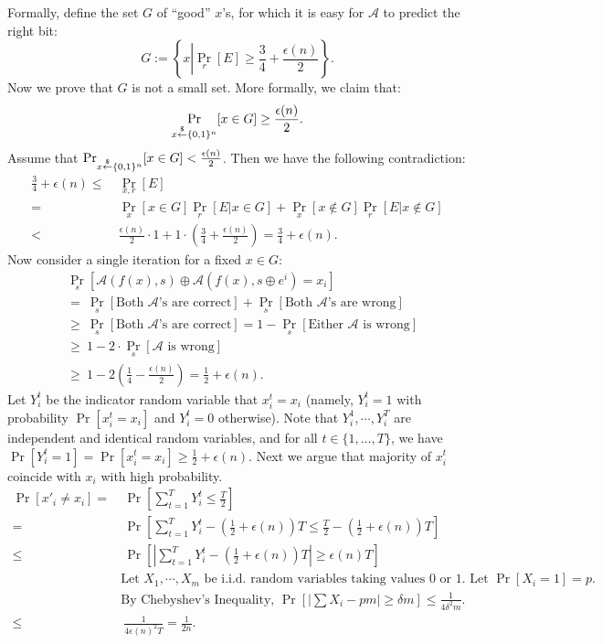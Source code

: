 \documentclass[12pt]{tufte-book}
\newcommand{\ma}{\mathcal{A}}
\begin{document}
Formally, define the set $G$ of ``good'' $x$'s, for which it is easy for $\ma$ to predict the right bit:
$$G := \left\{x \left| \Pr_r \left[ E \right]\geq \frac{3}{4} + \frac{\epsilon(n)}{2} \right. \right\}.$$
Now we prove that $G$ is not a small set. More formally, we claim that:
$$\Pr_{x \stackrel{\$}{\leftarrow} \{0,1\}^{n}}[x \in G] \geq \frac{\epsilon(n)}{2}.$$
Assume that $\Pr_{x \stackrel{\$}{\leftarrow} \{0,1\}^{n}}[x \in G] < \frac{\epsilon(n)}{2}$. Then we have the following contradiction:
\begin{align*}
\frac{3}{4} + \epsilon(n) \leq&~ \Pr_{x,r}[E]\\
=&~ \Pr_x [x \in G] \Pr_{r}[E| x\in G] + \Pr_x [x \notin G] \Pr_{r}[E | x\notin G]\\
< &~ \frac{\epsilon(n)}{2} \cdot 1 + 1\cdot \left(\frac{3}{4}+\frac{\epsilon(n)}{2}\right)  = \frac{3}{4} + \epsilon(n).
\end{align*}
Now consider a single iteration for a fixed $x \in G$:
\begin{align*}
&\Pr_{s} \left[ \ma(f(x), s) \oplus \ma(f(x), s\oplus e^i) = x_i \right]\\
&=~ \Pr_{s} \left[ \text{Both $\ma$'s are correct} \right] + \Pr_{s} \left[ \text{Both $\ma$'s are wrong} \right]\\
&\geq~ \Pr_{s} \left[ \text{Both $\ma$'s are correct} \right] = 1- \Pr_{s} \left[ \text{Either $\ma$ is wrong} \right]\\
&\geq~ 1- 2\cdot\Pr_{s} \left[ \text{$\ma$ is wrong} \right]\\
&\geq~ 1-2\left(\frac{1}{4} - \frac{\epsilon(n)}{2} \right) 
= \frac{1}{2} + \epsilon(n).
\end{align*}
Let $Y_i^t$ be the indicator random variable that $x_i^t = x_i$ (namely, $Y_i^t=1$ with probability $\Pr[x_i^t = x_i]$ and $Y_i^t=0$ otherwise).
Note that $Y_i^1, \cdots, Y_i^T$ are independent and identical random variables, and for all $t \in \{1,\ldots, T\}$, we have $\Pr[Y_i^t=1] = \Pr[x_i^t = x_i] \geq \frac{1}{2} + \epsilon(n)$.
Next we argue that majority of $x_i^t$ coincide with $x_i$ with high probability.
\begin{align*}
\Pr[x'_i \neq x_i]
=&~ \Pr\left[\sum_{t=1}^T Y_i^t \leq \frac{T}{2} \right]\\
=&~ \Pr\left[\sum_{t=1}^T  Y_i^t- \left(\frac{1}{2} + \epsilon(n) \right)T \leq \frac{T}{2} - \left(\frac{1}{2} + \epsilon(n) \right)T \right]\\
\leq&~ \Pr\left[ \left| \sum_{t=1}^T  Y_i^t- \left(\frac{1}{2} + \epsilon(n) \right)T \right| \geq \epsilon(n)T \right]\\
& \text{Let $X_1,\cdots,X_m$ be i.i.d. random variables taking values 0 or 1. Let $\Pr[X_i=1] = p$.}\\
& \text{By Chebyshev's Inequality, $\Pr\left[ \left| \sum X_i - pm \right| \geq \delta m \right] \leq \frac{1}{4\delta^2 m}$.}\\
\leq&~ \frac{1}{4\epsilon(n)^2T} = \frac{1}{2n}.
\end{align*}
\end{document}
